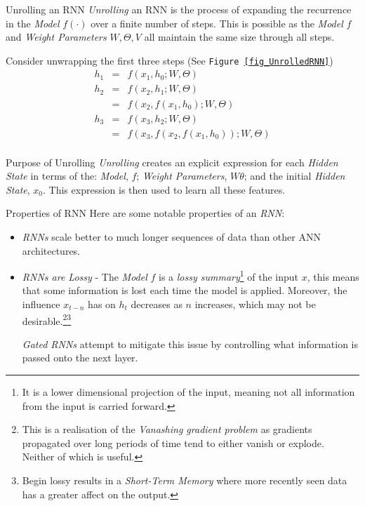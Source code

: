 \documentclass[11pt,a4paper]{article}
\begin{document}
  \begin{proposition}{Unrolling an RNN}
    \textit{Unrolling} an RNN is the process of expanding the recurrence in the \textit{Model} $f(\cdot)$ over a finite number of steps. This is possible as the \textit{Model} $f$ and \textit{Weight Parameters} $W,\Theta,V$ all maintain the same size through all steps.
    \par Consider unwrapping the first three steps (See \texttt{Figure \ref{fig_UnrolledRNN}})
    \[\begin{array}{rcl}
      h_1&=&f(x_1,h_0;W,\Theta)\\
      h_2&=&f(x_2,h_1;W,\Theta)\\
         &=&f(x_2,f(x_1,h_0);W,\Theta)\\
      h_3&=&f(x_3,h_2;W,\Theta)\\
         &=&f(x_3,f(x_2,f(x_1,h_0));W,\Theta)\\
    \end{array}\]
  \end{proposition}

  \begin{remark}{Purpose of Unrolling}
    \textit{Unrolling} creates an explicit expression for each \textit{Hidden State} in terms of the: \textit{Model}, $f$; \textit{Weight Parameters}, $W\theta$; and the initial \textit{Hidden State}, $x_0$. This expression is then used to learn all these features.
  \end{remark}

  \begin{remark}{Properties of RNN}
    Here are some notable properties of an \textit{RNN}:
    \begin{itemize}
      \item \textit{RNNs} scale better to much longer sequences of data than other ANN architectures.
      \item \textit{RNNs are Lossy} - The \textit{Model} $f$ is a \textit{lossy summary}\footnote{It is a lower dimensional projection of the input, meaning not all information from the input is carried forward.} of the input $x$, this means that some information is lost each time the model is applied. Moreover, the influence $x_{t-n}$ has on $h_t$ decreases as $n$ increases, which may not be desirable.\footnote{This is a realisation of the \textit{Vanashing gradient problem} as gradients propagated over long periods of time tend to either vanish or explode. Neither of which is useful.}\footnote{Begin lossy results in a \textit{Short-Term Memory} where more recently seen data has a greater affect on the output.}
      \par \textit{Gated RNNs} attempt to mitigate this issue by controlling what information is passed onto the next layer.
    \end{itemize}
  \end{remark}
\end{document}
